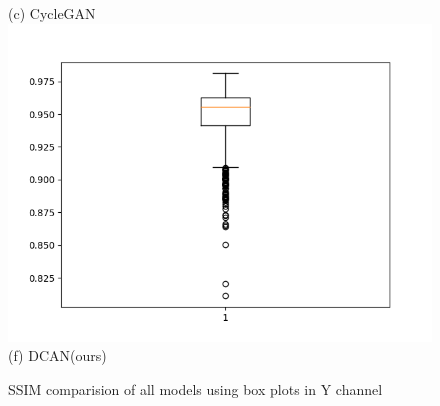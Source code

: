 \documentclass[conference]{IEEEtran}
\begin{document}
\begin{figure}[h!]
\begin{minipage}{0.3\textwidth}
  (c) CycleGAN
  \includegraphics[width=\textwidth,height=0.2\textheight]{Figures/proposed_ssim_Y.png}
  (f) DCAN(ours)
  \end{minipage}%
  \caption{SSIM comparision of all models using box plots in Y channel}
  \label{SSIM:Y}
  \end{figure}

  
\end{document}
